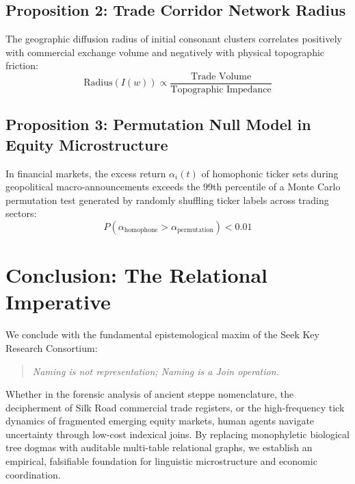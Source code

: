\documentclass[11pt,a4paper]{article}
\begin{document}
\subsection{Proposition 2: Trade Corridor Network Radius}
The geographic diffusion radius of initial consonant clusters correlates positively with commercial exchange volume and negatively with physical topographic friction:
\begin{equation}
    \text{Radius}(I(w)) \propto \frac{\text{Trade Volume}}{\text{Topographic Impedance}}
\end{equation}

\subsection{Proposition 3: Permutation Null Model in Equity Microstructure}
In financial markets, the excess return $\alpha_i(t)$ of homophonic ticker sets during geopolitical macro-announcements exceeds the 99th percentile of a Monte Carlo permutation test generated by randomly shuffling ticker labels across trading sectors:
\begin{equation}
    P\left( \alpha_{\text{homophone}} > \alpha_{\text{permutation}} \right) < 0.01
\end{equation}

\section{Conclusion: The Relational Imperative}

We conclude with the fundamental epistemological maxim of the Seek Key Research Consortium:
\begin{quote}
\textit{Naming is not representation; Naming is a Join operation.}
\end{quote}
Whether in the forensic analysis of ancient steppe nomenclature, the decipherment of Silk Road commercial trade registers, or the high-frequency tick dynamics of fragmented emerging equity markets, human agents navigate uncertainty through low-cost indexical joins. By replacing monophyletic biological tree dogmas with auditable multi-table relational graphs, we establish an empirical, falsifiable foundation for linguistic microstructure and economic coordination.



\end{document}
